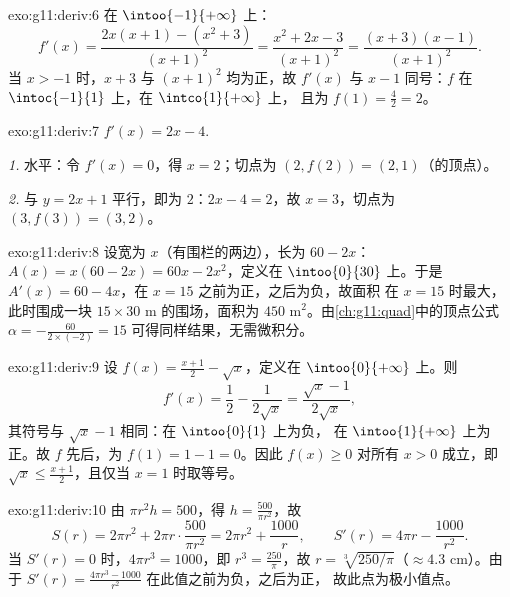 \begin{solution}{exo:g11:deriv:6}
在 $\intoo{-1}{+\infty}$ 上：
\[
f'(x) = \frac{2x(x+1) - (x^2+3)}{(x+1)^2}
= \frac{x^2 + 2x - 3}{(x+1)^2}
= \frac{(x+3)(x-1)}{(x+1)^2}.
\]
当 $x > -1$ 时，$x + 3$ 与 $(x+1)^2$ 均为正，故 $f'(x)$ 与
$x - 1$ 同号：$f$ 在 $\intoc{-1}{1}$ 上，在 $\intco{1}{+\infty}$ 上，
且为 $f(1) = \frac{4}{2} = 2$。
\end{solution}

\begin{solution}{exo:g11:deriv:7}
$f'(x) = 2x - 4$.

\emph{1.} 水平：令 $f'(x) = 0$，得 $x = 2$；切点为
$(2, f(2)) = (2, 1)$（的顶点）。

\emph{2.} 与 $y = 2x + 1$ 平行，即为 $2$：$2x - 4 = 2$，故
$x = 3$，切点为 $(3, f(3)) = (3, 2)$。
\end{solution}

\begin{solution}{exo:g11:deriv:8}
设宽为 $x$（有围栏的两边），长为 $60 - 2x$：
$A(x) = x(60 - 2x) = 60x - 2x^2$，定义在 $\intoo{0}{30}$ 上。于是
$A'(x) = 60 - 4x$，在 $x = 15$ 之前为正，之后为负，故面积
在 $x = 15$ 时最大，此时围成一块 $15 \times 30$ m 的围场，面积为
$450$ m$^2$。由\cref{ch:g11:quad}中的顶点公式
$\alpha = -\frac{60}{2 \times (-2)} = 15$ 可得同样结果，无需微积分。
\end{solution}

\begin{solution}{exo:g11:deriv:9}
设 $f(x) = \frac{x+1}{2} - \sqrt x$，定义在 $\intoo{0}{+\infty}$ 上。则
\[
f'(x) = \frac12 - \frac{1}{2\sqrt x} = \frac{\sqrt x - 1}{2\sqrt x},
\]
其符号与 $\sqrt x - 1$ 相同：在 $\intoo{0}{1}$ 上为负，
在 $\intoo{1}{+\infty}$ 上为正。故 $f$ 先后，为
$f(1) = 1 - 1 = 0$。因此 $f(x) \geq 0$ 对所有 $x > 0$ 成立，即
$\sqrt x \leq \frac{x+1}{2}$，且仅当 $x = 1$ 时取等号。
\end{solution}

\begin{solution}{exo:g11:deriv:10}
由 $\pi r^2 h = 500$，得 $h = \frac{500}{\pi r^2}$，故
\[
S(r) = 2\pi r^2 + 2\pi r \cdot \frac{500}{\pi r^2}
= 2\pi r^2 + \frac{1000}{r},
\qquad
S'(r) = 4\pi r - \frac{1000}{r^2}.
\]
当 $S'(r) = 0$ 时，$4\pi r^3 = 1000$，即 $r^3 = \frac{250}{\pi}$，故
$r = \sqrt[3]{250/\pi}$（$\approx 4.3$ cm）。由于 $S'(r) =
\frac{4\pi r^3 - 1000}{r^2}$ 在此值之前为负，之后为正，
故此点为极小值点。
\end{solution}

